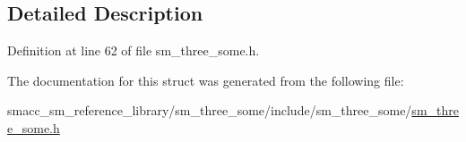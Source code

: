 \subsection{Detailed Description}


Definition at line 62 of file sm\+\_\+three\+\_\+some.\+h.



The documentation for this struct was generated from the following file\+:\begin{DoxyCompactItemize}
\item 
smacc\+\_\+sm\+\_\+reference\+\_\+library/sm\+\_\+three\+\_\+some/include/sm\+\_\+three\+\_\+some/\hyperlink{sm__three__some_8h}{sm\+\_\+three\+\_\+some.\+h}\end{DoxyCompactItemize}

